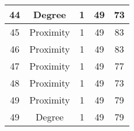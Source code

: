 \documentclass[results.tex]{subfiles}
\begin{document}
\begin{center}
\begin{tabular}{| c || c | c | c | c |}
            \hline
            44                      & Degree                       & 1                      & 49                      & 73                   \\
            \hline
            45                      & Proximity                    & 1                      & 49                      & 83                   \\
            \hline
            46                      & Proximity                    & 1                      & 49                      & 83                   \\
            \hline
            47                      & Proximity                    & 1                      & 49                      & 77                   \\
            \hline
            48                      & Proximity                    & 1                      & 49                      & 73                   \\
            \hline
            49                      & Proximity                    & 1                      & 49                      & 79                   \\
            \hline
            49                      & Degree                       & 1                      & 49                      & 79                   \\
            \hline
        \end{tabular}
    \end{center}
\end{document}
